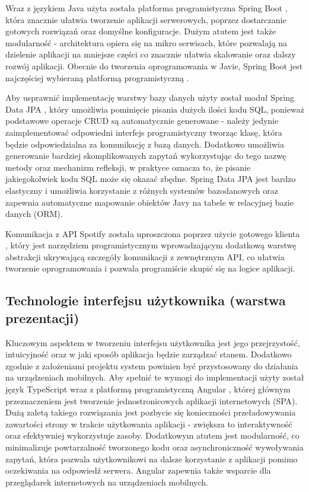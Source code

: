 Wraz z językiem Java użyta została platforma programistyczna Spring Boot \cite{bib:spring_boot}, która znacznie ułatwia tworzenie aplikacji serwerowych, poprzez dostarczanie gotowych rozwiązań oraz domyślne konfiguracje. Dużym atutem jest także modularność - architektura opiera się na mikro serwisach, które pozwalają na dzielenie aplikacji na mniejsze części co znacznie ułatwia skalowanie oraz dalszy rozwój aplikacji. Obecnie do tworzenia oprogramowania w Javie, Spring Boot jest najczęściej wybieraną platformą programistyczną \cite{bib:spring_market_analysis}.

Aby usprawnić implementację warstwy bazy danych użyty został moduł Spring Data JPA \cite{bib:spring_jpa}, który umożliwia pominięcie pisania dużych ilości kodu SQL, ponieważ podstawowe operacje CRUD są automatycznie generowane - należy jedynie zaimplementować odpowiedni interfejs programistyczny tworząc klasę, która będzie odpowiedzialna za komunikację z bazą danych. Dodatkowo umożliwia generowanie bardziej skomplikowanych zapytań wykorzystując do tego nazwę metody oraz mechanizm refleksji, w praktyce oznacza to, że pisanie jakiegokolwiek kodu SQL może się okazać zbędne. Spring Data JPA jest bardzo elastyczny i umożliwia korzystanie z różnych systemów bazodanowych oraz zapewnia automatyczne mapowanie obiektów Javy na tabele w relacyjnej bazie danych (ORM).

Komunikacja z API Spotify została uproszczona poprzez użycie gotowego klienta \cite{bib:spotify_client_java}, który jest narzędziem programistycznym wprowadzającym dodatkową warstwę abstrakcji ukrywającą szczegóły komunikacji z zewnętrznym API, co ułatwia tworzenie oprogramowania i pozwala programiście skupić się na logice aplikacji.

\subsection{Technologie interfejsu użytkownika (warstwa prezentacji)}
Kluczowym aspektem w tworzeniu interfejsu użytkownika jest jego przejrzystość, intuicyjność oraz w jaki sposób aplikacja będzie zarządzać stanem. Dodatkowo zgodnie z założeniami projektu system powinien być przystosowany do działania na urządzeniach mobilnych. Aby spełnić te wymogi do implementacji użyty został język TypeScript wraz z platformą programistyczną Angular \cite{bib:angular}, której głównym przeznaczeniem jest tworzenie jednostronicowych aplikacji internetowych (SPA). Dużą zaletą takiego rozwiązania jest pozbycie się konieczności przeładowywania zawartości strony w trakcie użytkowania aplikacji - zwiększa to interaktywność oraz efektywniej wykorzystuje zasoby. Dodatkowym atutem jest modularność, co minimalizuje powtarzalność tworzonego kodu oraz asynchroniczność wywoływania zapytań, która pozwala użytkownikowi na dalsze korzystanie z aplikacji pomimo oczekiwania na odpowiedź serwera. Angular zapewnia także wsparcie dla przeglądarek internetowych na urządzeniach mobilnych.

